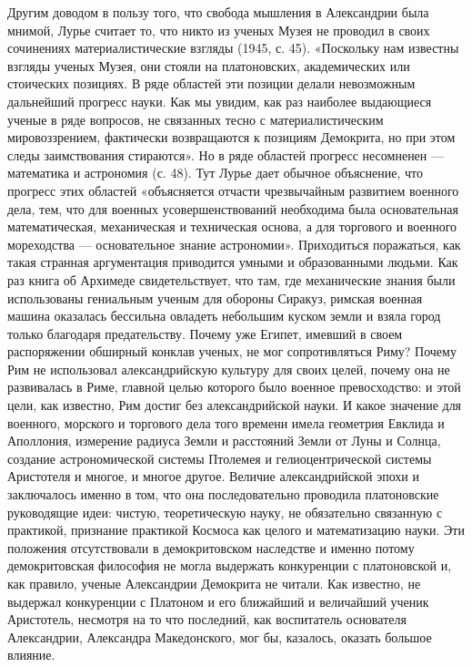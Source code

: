 Другим доводом в пользу того, что свобода мышления в Александрии была
мнимой, Лурье считает то, что никто из ученых Музея не проводил в
своих сочинениях материалистические взгляды (1945, с. 45). «Поскольку
нам известны взгляды ученых Музея, они стояли на платоновских,
академических или стоических позициях. В ряде областей эти позиции
делали невозможным дальнейший прогресс науки. Как мы увидим, как раз
наиболее выдающиеся ученые в ряде вопросов, не связанных тесно с
материалистическим мировоззрением, фактически возвращаются к позициям
Демокрита, но при этом следы заимствования стираются». Но в ряде
областей прогресс несомненен --- математика и астрономия (с. 48). Тут
Лурье дает обычное объяснение, что прогресс этих областей «объясняется
отчасти чрезвычайным развитием военного дела, тем, что для военных
усовершенствований необходима была основательная математическая,
механическая и техническая основа, а для торгового и военного
мореходства --- основательное знание астрономии». Приходиться
поражаться, как такая странная аргументация приводится умными и
образованными людьми. Как раз книга об Архимеде свидетельствует, что
там, где механические знания были использованы гениальным ученым для
обороны Сиракуз, римская военная машина оказалась бессильна овладеть
небольшим куском земли и взяла город только благодаря предательству.
Почему уже Египет, имевший в своем распоряжении обширный конклав
ученых, не мог сопротивляться Риму? Почему Рим не использовал
александрийскую культуру для своих целей, почему она не развивалась в
Риме, главной целью которого было военное превосходство: и этой цели,
как известно, Рим достиг без александрийской науки. И какое значение
для военного, морского и торгового дела того времени имела геометрия
Евклида и Аполлония, измерение радиуса Земли и расстояний Земли от
Луны и Солнца, создание астрономической системы Птолемея и
гелиоцентрической системы Аристотеля и многое, и многое другое.
Величие александрийской эпохи и заключалось именно в том, что она
последовательно проводила платоновские руководящие идеи: чистую,
теоретическую науку, не обязательно связанную с практикой, признание
практикой Космоса как целого и математизацию науки. Эти положения
отсутствовали в демокритовском наследстве и именно потому
демокритовская философия не могла выдержать конкуренции с платоновской
и, как правило, ученые Александрии Демокрита не читали. Как известно,
не выдержал конкуренции с Платоном и его ближайший и величайший ученик
Аристотель, несмотря на то что последний, как воспитатель основателя
Александрии, Александра Македонского, мог бы, казалось, оказать
большое влияние.

